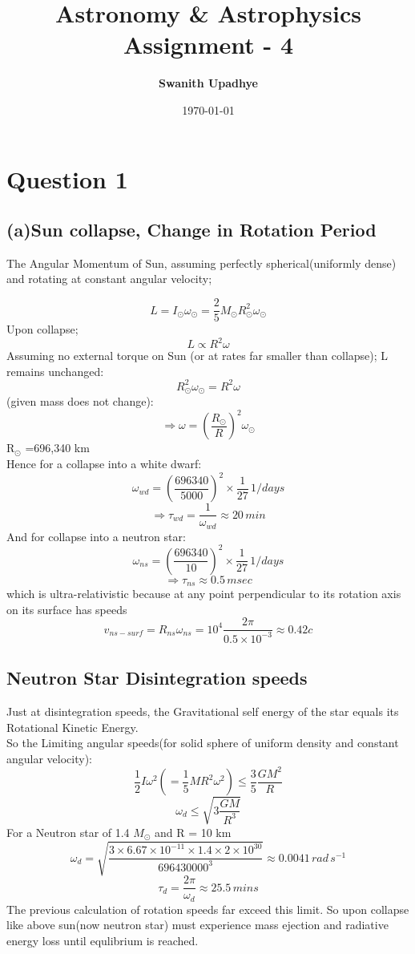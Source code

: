 \documentclass[11pt]{article}
\title{Astronomy \& Astrophysics Assignment - 4}
\author{\textbf{\Large Swanith Upadhye}}
\date{\today}
\begin{document}
	
	\maketitle
	\noindent\hrulefill
	\Large
	
	\section{\color{teal} Question 1}
	\subsection{(a)Sun collapse, Change in Rotation Period}
	
	The Angular Momentum of Sun, assuming perfectly spherical(uniformly dense) and rotating at constant angular velocity;
	
	\[
		L = I_\odot \omega_\odot = \frac{2}{5} M_\odot R_\odot^2 \omega_\odot
	\]
	Upon collapse;
	\[
		L \propto R^2 \omega
	\]
	Assuming no external torque on Sun (or at rates far smaller than collapse); L remains unchanged:
	\[
		R_\odot^2 \omega_\odot = R^2 \omega
	\]
	(given mass does not change):
	\[
		\Rightarrow \omega = (\frac{R_\odot}{R})^2 \omega_\odot
	\]
	R$_\odot$ =696,340 km\\
	Hence for a collapse into a white dwarf:
	\[
		\omega_{wd} = (\frac{696340}{5000})^2 \times \frac{1}{27} \, 1/days
	\]
	\[
		\Rightarrow \boxed{\tau_{wd} = \frac{1}{\omega_{wd}} \approx 20 \, min}
	\]
	And for collapse into a neutron star:
	\[
		\omega_{ns} = (\frac{696340}{10})^2 \times \frac{1}{27} \, 1/days
	\]
	\[
		\Rightarrow \boxed{\tau_{ns} \approx 0.5 \, msec}
	\]
	which is ultra-relativistic because at any point perpendicular to its rotation axis on its surface has speeds
	\[
		v_{ns-surf} = R_{ns} \omega_{ns} = 10^4 \frac{2\pi}{0.5 \times 10^{-3}} \approx 0.42 c
	\]
	
	\subsection{Neutron Star Disintegration speeds}
	
	Just at disintegration speeds, the Gravitational self energy of the star equals its Rotational Kinetic Energy.\\
	So the Limiting angular speeds(for solid sphere of uniform density and constant angular velocity):
	\[
		\frac{1}{2} I \omega^2 (= \frac{1}{5}MR^2\omega^2)\le \frac{3}{5}\frac{GM^2}{R}
	\]
	\[
		\omega_d \le \sqrt{3\frac{GM}{R^3}}
	\]
	For a Neutron star of 1.4 $M_\odot$ and R = 10 km 
	\[
		\omega_d = \sqrt{\frac{3\times 6.67\times 10^{-11}\times 1.4\times 2\times 10^{30}}{696430000^3}} \approx 0.0041 \, rad \, s^{-1}
	\]
	\[
		\boxed{\tau_d = \frac{2\pi}{\omega_d} \approx 25.5 \,mins}
	\]
	The previous calculation of rotation speeds far exceed this limit. So upon collapse like above sun(now neutron star) must experience mass ejection and radiative energy loss until equlibrium is reached.
	
\end{document}
